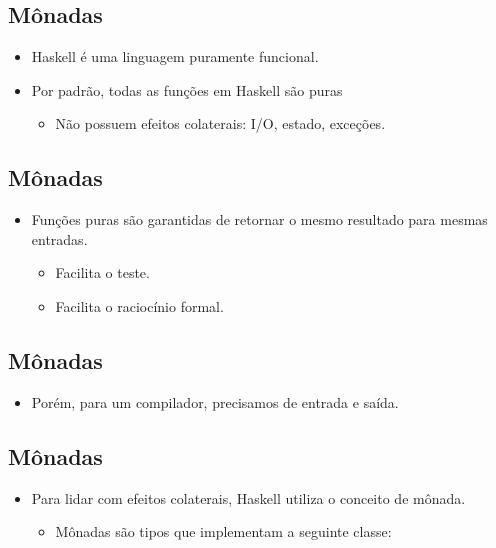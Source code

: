 \documentclass[11pt]{article}
\begin{document}
\subsection*{Mônadas}
\label{sec:org4e4e3f5}

\begin{itemize}
\item Haskell é uma linguagem puramente funcional.

\item Por padrão, todas as funções em Haskell são puras
\begin{itemize}
\item Não possuem efeitos colaterais: I/O, estado, exceções.
\end{itemize}
\end{itemize}
\subsection*{Mônadas}
\label{sec:orgfdd5163}

\begin{itemize}
\item Funções puras são garantidas de retornar o mesmo resultado para mesmas entradas.
\begin{itemize}
\item Facilita o teste.
\item Facilita o raciocínio formal.
\end{itemize}
\end{itemize}
\subsection*{Mônadas}
\label{sec:org1cf0149}

\begin{itemize}
\item Porém, para um compilador, precisamos de entrada e saída.
\end{itemize}
\subsection*{Mônadas}
\label{sec:orgd8dea09}

\begin{itemize}
\item Para lidar com efeitos colaterais, Haskell utiliza o conceito de mônada.
\begin{itemize}
\item Mônadas são tipos que implementam a seguinte classe:
\end{itemize}
\end{itemize}
\end{document}
